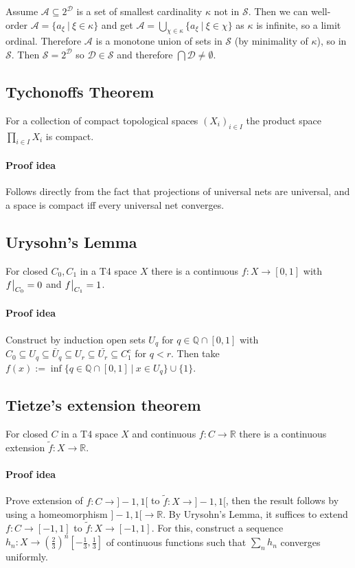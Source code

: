 \documentclass{scrartcl}
\newcommand{\R}{\mathbb{R}}
\newcommand{\Q}{\mathbb{Q}}
\newcommand\restr[2]{{
    \left.\kern-\nulldelimiterspace
    #1
    \vphantom{\big|}
    \right|_{#2}
}}
\begin{document}
Assume $\mathcal{A} \subseteq 2^\mathcal{D}$ is a set of smallest cardinality $\kappa$ not in $\mathcal{S}$. Then we can well-order $\mathcal{A} = \{a_\xi \ | \ \xi \in \kappa\}$ and get $\mathcal{A} = \bigcup_{\chi \in \kappa} \{ a_\xi \ | \ \xi \in \chi\}$ as $\kappa$ is infinite, so a limit ordinal. Therefore $\mathcal{A}$ is a monotone union of sets in $\mathcal{S}$ (by minimality of $\kappa$), so in $\mathcal{S}$.
Then $\mathcal{S} = 2^\mathcal{D}$ so $\mathcal{D} \in \mathcal{S}$ and therefore $\bigcap \mathcal{D} \neq \emptyset$.

\subsection{Tychonoffs Theorem}
For a collection of compact topological spaces $(X_i)_{i \in I}$ the product space $\prod_{i \in I} X_i$ is compact.
\paragraph{Proof idea} Follows directly from the fact that projections of universal nets are universal, and a space is compact iff every universal net converges.

\subsection{Urysohn's Lemma}
For closed $C_0, C_1$ in a T4 space $X$ there is a continuous $f: X \to [0, 1]$ with $\restr{f}{C_0} = 0$ and $\restr{f}{C_1} = 1$.
\paragraph{Proof idea} Construct by induction open sets $U_q$ for $q \in \Q \cap [0, 1]$ with $C_0 \subseteq U_q \subseteq \bar{U}_q \subseteq U_r \subseteq \bar{U_r} \subseteq C_1^c$ for $q < r$. Then take $f(x) := \inf \{q \in \Q \cap [0, 1] \ | \ x \in U_q \} \cup \{1\}$.

\subsection{Tietze's extension theorem}
For closed $C$ in a T4 space $X$ and continuous $f: C \to \R$ there is a continuous extension $\tilde{f}: X \to \R$.
\paragraph{Proof idea} Prove extension of $f: C \to ]-1,1[$ to $\tilde{f}: X \to ]-1,1[$, then the result follows by using a homeomorphism $]-1,1[ \to \R$.
By Urysohn's Lemma, it suffices to extend $f: C \to [-1, 1]$ to $\tilde{f}: X \to [-1, 1]$. For this, construct a sequence $h_n: X \to (\frac 2 3)^n [-\frac 1 3, \frac 1 3]$ of continuous functions such that $\sum_n h_n$ converges uniformly.
\end{document}
